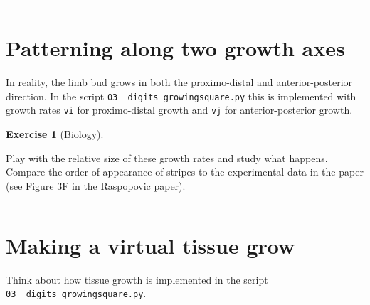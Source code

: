 \documentclass[
  letterpaper,
  DIV=11,
  numbers=noendperiod]{scrreprt}
\theoremstyle{definition}
\newtheorem{exercise}{Exercise}[chapter]
\theoremstyle{remark}
\begin{document}
\begin{center}\rule{0.5\linewidth}{0.5pt}\end{center}

\section{Patterning along two growth
axes}\label{patterning-along-two-growth-axes}

In reality, the limb bud grows in both the proximo-distal and
anterior-posterior direction. In the script
\texttt{03\_\_digits\_growingsquare.py} this is implemented with growth
rates \texttt{vi} for proximo-distal growth and \texttt{vj} for
anterior-posterior growth.

\begin{exercise}[Biology]\protect\hypertarget{exr-tur}{}\label{exr-tur}

Play with the relative size of these growth rates and study what
happens. Compare the order of appearance of stripes to the experimental
data in the paper (see Figure 3F in the Raspopovic paper).

\end{exercise}

\begin{center}\rule{0.5\linewidth}{0.5pt}\end{center}

\section{Making a virtual tissue
grow}\label{making-a-virtual-tissue-grow}

Think about how tissue growth is implemented in the script
\texttt{03\_\_digits\_growingsquare.py}.
\end{document}

